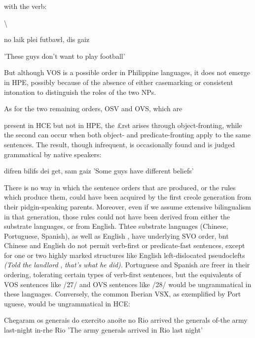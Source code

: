 with the verb:

{\textbackslash}


\ea\label{ex:27}
 no laik plei futbawl, dis gaiz
\glt
\z

'These guys don't want to play football'

But although VOS is a possible order in Philippine languages, it does not emerge in HPE, possibly because of the absence of either case\-marking or consistent intonation to distinguish the roles of the two NPs.

As for the two remaining orders, OSV and OVS, which are

present in HCE but not in HPE, the £rst arises through object-fronting, while the second can occur when both object- and predicate-fronting apply to the same sentences. The result, though infrequent, is occasion\-ally found and is judged grammatical by native speakers:

\ea\label{ex:28}
 difren bilifs dei get, sam gaiz 'Some guys have different beliefs'
\glt
\z

There is no way in which the sentence orders that are produced, or the rules which produce them, could have been acquired by the first creole generation from their pidgin-speaking parents. Moreover, even if we assume extensive bilingualism in that generation, those rules could not have been derived from either the substrate languages, or from English. Thtee substrate languages (Chinese, Portuguese, Spanish), as well as English , have underlying SVO order, bnt Chinese and English do not permit verb-first or predicate-fast sentences, except for one or two highly marked structures like English left-dislocated pseudo\-clefts \textit{(Told} \textit{the} \textit{landlord} , \textit{that's} \textit{what} \textit{he} \textit{did)}\textit{.} Portuguese and Spanish are freer in their ordering, tolerating certain types of verb-first sen\-tences, but the equivalents of VOS sentences like /27/ and OVS sen\-tences like /28/ would be ungrammatical in these languages. Conversely, the common Iberian VSX, as exemplified by Port uguese, would be ungrammatical in HCE:

\ea\label{ex:29}
 Chegaram os generais do exercito anoite no Rio arrived the generals of-the army last-night in-rhe Rio 'The army generals arrived in Rio last night'
\glt
\z


